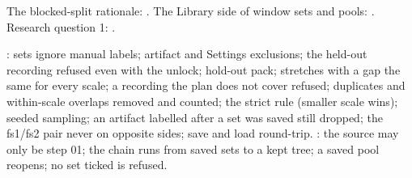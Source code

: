 The blocked-split rationale: \citet{roberts2017cross}. The Library side of window sets and
pools: . Research question 1:
.

: sets ignore manual labels; artifact and Settings
exclusions; the held-out recording refused even with the unlock; hold-out pack; stretches
with a gap the same for every scale; a recording the plan does not cover refused; duplicates
and within-scale overlaps removed and counted; the strict rule (smaller scale wins); seeded
sampling; an artifact labelled after a set was saved still dropped; the fs1/fs2 pair never
on opposite sides; save and load round-trip. : the source may
only be step 01; the chain runs from saved sets to a kept tree; a saved pool reopens; no set
ticked is refused.
